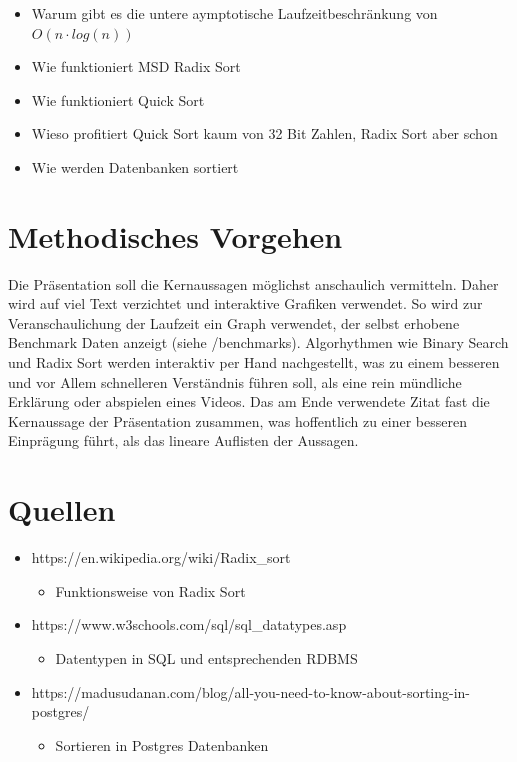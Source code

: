 \documentclass[a4paper, 12pt, oneside]{article}
\begin{document}
    \begin{itemize}
        \item Warum gibt es die untere aymptotische Laufzeitbeschränkung von $O(n \cdot log(n))$
        \item Wie funktioniert MSD Radix Sort 
        \item Wie funktioniert Quick Sort
        \item Wieso profitiert Quick Sort kaum von 32 Bit Zahlen, Radix Sort aber schon
        \item Wie werden Datenbanken sortiert
    \end{itemize}


    \section{Methodisches Vorgehen}

    Die Präsentation soll die Kernaussagen möglichst anschaulich vermitteln. 
    Daher wird auf viel Text verzichtet und interaktive Grafiken verwendet.
    So wird zur Veranschaulichung der Laufzeit ein Graph verwendet, der selbst 
    erhobene Benchmark Daten anzeigt (siehe /benchmarks). 
    Algorhythmen wie Binary Search und Radix Sort werden interaktiv per Hand 
    nachgestellt, was zu einem besseren und vor Allem schnelleren Verständnis
    führen soll, als eine rein mündliche Erklärung oder abspielen eines Videos. 
    Das am Ende verwendete Zitat fast die Kernaussage der Präsentation zusammen, was 
    hoffentlich zu einer besseren Einprägung führt, als das lineare 
    Auflisten der Aussagen.


    \clearpage
    \section{Quellen}

    \begin{itemize}
        \item https://en.wikipedia.org/wiki/Radix\_sort
        \begin{itemize}
            \item Funktionsweise von Radix Sort
        \end{itemize}
        \item https://www.w3schools.com/sql/sql\_datatypes.asp
        \begin{itemize}
            \item Datentypen in SQL und entsprechenden RDBMS
        \end{itemize}
        \item https://madusudanan.com/blog/all-you-need-to-know-about-sorting-in-postgres/
        \begin{itemize}
            \item Sortieren in Postgres Datenbanken 
        \end{itemize}
    \end{itemize}
\end{document}
